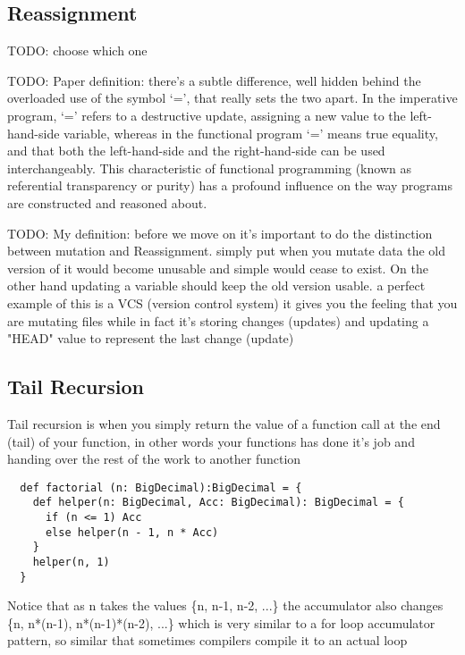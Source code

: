 \documentclass[conference]{IEEEtran}
\begin{document}
\subsection{Reassignment}
TODO: choose which one

TODO: Paper definition:
there's a subtle difference, well
hidden behind the overloaded use of the symbol
‘=’, that really sets the two apart. In the imperative
program, ‘=’ refers to a destructive update, assigning
a new value to the left-hand-side variable,
whereas in the functional program ‘=’ means true
equality, and that both the left-hand-side and the right-hand-side can be used interchangeably. This characteristic
of functional programming (known as referential
transparency or purity) has a profound influence
on the way programs are constructed and reasoned
about.

TODO: My definition:
before we move on it's important to do the distinction between mutation and Reassignment. simply put when you mutate data the old version of it would become unusable and simple would cease to exist. On the other hand updating a variable should keep the old version usable. a perfect example of this is a VCS (version control system) it gives you the feeling that you are mutating files while in fact it's storing changes (updates) and updating a "HEAD" value to represent the last change (update)



\subsection{Tail Recursion}
Tail recursion is when you simply return the value of a function call at the end (tail) of your function, in other words your functions has done it's job and handing over the rest of the work to another function
\begin{lstlisting}
  def factorial (n: BigDecimal):BigDecimal = {
    def helper(n: BigDecimal, Acc: BigDecimal): BigDecimal = {
      if (n <= 1) Acc
      else helper(n - 1, n * Acc)
    }
    helper(n, 1)
  }
\end{lstlisting}
Notice that as n takes the values \{n, n-1, n-2, ...\}
the accumulator also changes \{n, n*(n-1), n*(n-1)*(n-2), ...\}
which is very similar to a for loop accumulator pattern, so similar that sometimes compilers compile it to an actual loop
\end{document}
